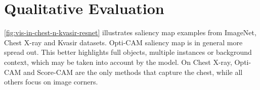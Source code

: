 \section{Qualitative Evaluation}
\label{sec:oc_qual}
\autoref{fig:vis-in-chest-n-kvasir-resnet} illustrates saliency map examples from ImageNet, Chest 
X-ray and Kvasir datasets. Opti-CAM saliency map is in general more spread out. This better 
highlights full objects, multiple instances or background context, which may be taken into account 
by the model. On Chest X-ray, Opti-CAM and Score-CAM are the only methods that capture the chest, 
while all others focus on image corners. 


